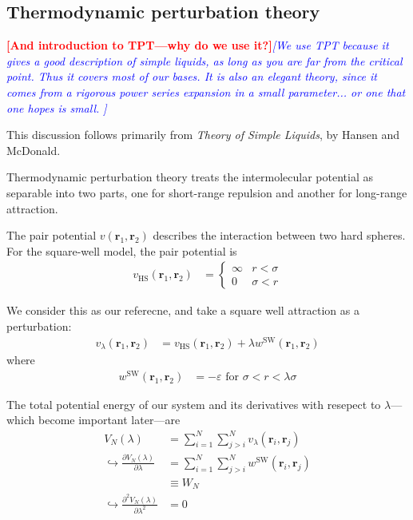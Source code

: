 \documentclass[letterpaper,twocolumn,amsmath,amssymb,prb]{revtex4-1}
\newcommand{\1}{\ensuremath{\textbf{r}_1}}
\newcommand{\2}{\ensuremath{\textbf{r}_2}}
\newcommand{\3}{\ensuremath{\textbf{r}_3}}
\newcommand{\4}{\ensuremath{\textbf{r}_4}}
\newcommand{\fixme}[1]{\textcolor{red}{\textbf{[#1]}}}
\newcommand{\davidsays}[1]{\textcolor{blue}{\textit{[#1]}}}
\begin{document}
\subsection{Thermodynamic perturbation theory}\label{subsec:TPT}

\fixme{And introduction to TPT---why do we use it?}\davidsays{We use
  TPT because it gives a good description of simple liquids, as long
  as you are far from the critical point.  Thus it covers most of our
  bases.  It is also an elegant theory, since it comes from a rigorous
  power series expansion in a small parameter... or one that one hopes
  is small. }

This discussion follows primarily from \textit{Theory of Simple
  Liquids}, by Hansen and McDonald\cite{Hansen06}.

Thermodynamic perturbation theory treats the intermolecular potential
as separable into two parts, one for short-range repulsion and another
for long-range attraction.

The pair potential $v(\1,\2)$ describes the interaction between two
hard spheres. For the square-well model, the pair potential is
\begin{align}
  v_\text{HS}(\1,\2) &=
    \begin{cases}
      \infty & r < \sigma \\
      0 & \sigma < r
    \end{cases}
\end{align}

We consider this as our referecne, and take a square well attraction as a perturbation:
\begin{align}
  v_\lambda(\1,\2) &= v_\text{HS}(\1,\2) + \lambda w^\text{SW}(\1,\2) \label{eqn:small-perturbation}
\end{align}
where
\begin{align}
  w^\text{SW}(\1,\2) &= - \varepsilon \text{ for } \sigma < r < \lambda\sigma
\end{align}

The total potential energy of our system and its derivatives with resepect to $\lambda$---which become important later---are
\begin{align}
  V_N(\lambda) &= \sum_{i=1}^N\sum_{j>i}^N v_\lambda(\mathbf{r}_i,\mathbf{r}_j) \\ %
  \hookrightarrow \frac{\partial V_N(\lambda)}{\partial\lambda} &= \sum_{i=1}^N\sum_{j>i}^N w^\text{SW}(\mathbf{r}_i,\mathbf{r}_j) \nonumber \\
  &\equiv W_N \\
  \hookrightarrow \frac{\partial^2 V_N(\lambda)}{\partial\lambda^2} &= 0
\end{align}
\end{document}
